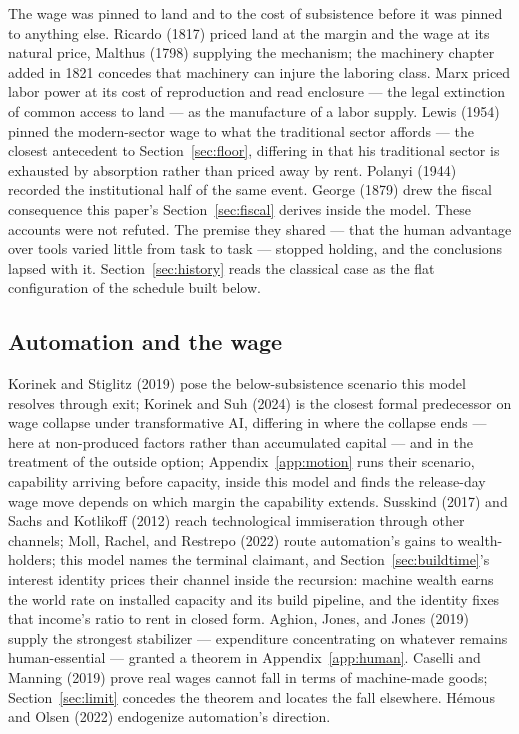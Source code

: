 \documentclass[12pt]{article}
\theoremstyle{plain}
\begin{document}
The wage was pinned to land and to the cost of subsistence before it was pinned to anything else. Ricardo (1817) priced land at the margin and the wage at its natural price, Malthus (1798) supplying the mechanism; the machinery chapter added in 1821 concedes that machinery can injure the laboring class. Marx priced labor power at its cost of reproduction and read enclosure --- the legal extinction of common access to land --- as the manufacture of a labor supply. Lewis (1954) pinned the modern-sector wage to what the traditional sector affords --- the closest antecedent to Section~\ref{sec:floor}, differing in that his traditional sector is exhausted by absorption rather than priced away by rent. Polanyi (1944) recorded the institutional half of the same event. George (1879) drew the fiscal consequence this paper's Section~\ref{sec:fiscal} derives inside the model. These accounts were not refuted. The premise they shared --- that the human advantage over tools varied little from task to task --- stopped holding, and the conclusions lapsed with it. Section~\ref{sec:history} reads the classical case as the flat configuration of the schedule built below.

\subsection{Automation and the wage}\label{sec:automation}

Korinek and Stiglitz (2019) pose the below-subsistence scenario this model resolves through exit; Korinek and Suh (2024) is the closest formal predecessor on wage collapse under transformative AI, differing in where the collapse ends --- here at non-produced factors rather than accumulated capital --- and in the treatment of the outside option; Appendix~\ref{app:motion} runs their scenario, capability arriving before capacity, inside this model and finds the release-day wage move depends on which margin the capability extends. Susskind (2017) and Sachs and Kotlikoff (2012) reach technological immiseration through other channels; Moll, Rachel, and Restrepo (2022) route automation's gains to wealth-holders; this model names the terminal claimant, and Section~\ref{sec:buildtime}'s interest identity prices their channel inside the recursion: machine wealth earns the world rate on installed capacity and its build pipeline, and the identity fixes that income's ratio to rent in closed form. Aghion, Jones, and Jones (2019) supply the strongest stabilizer --- expenditure concentrating on whatever remains human-essential --- granted a theorem in Appendix~\ref{app:human}. Caselli and Manning (2019) prove real wages cannot fall in terms of machine-made goods; Section~\ref{sec:limit} concedes the theorem and locates the fall elsewhere. Hémous and Olsen (2022) endogenize automation's direction.
\end{document}
